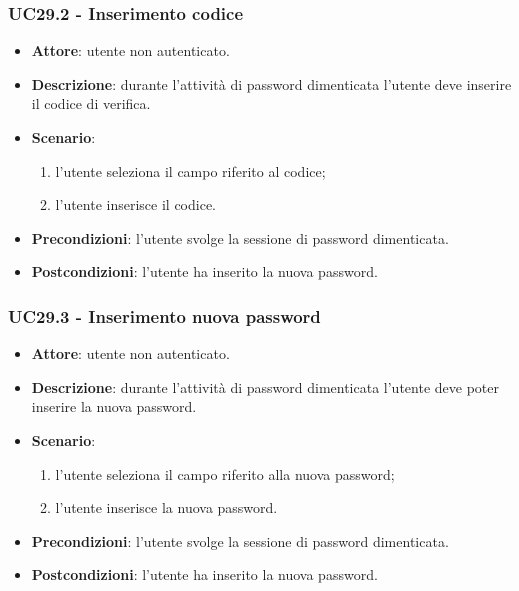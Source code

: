 \subsubsection{UC29.2 - Inserimento codice}
\begin{itemize}
    \item \textbf{Attore}: utente non autenticato.
    \item \textbf{Descrizione}: durante l'attività di password dimenticata l'utente deve inserire il codice di verifica.
    \item \textbf{Scenario}:
    \begin{enumerate}
        \item l'utente seleziona il campo riferito al codice;
        \item l'utente inserisce il codice.
    \end{enumerate}

    \item \textbf{Precondizioni}: l'utente svolge la sessione di password dimenticata.
    \item \textbf{Postcondizioni}: l'utente ha inserito la nuova password.
\end{itemize}

\subsubsection{UC29.3 - Inserimento nuova password}
\begin{itemize}
    \item \textbf{Attore}: utente non autenticato.
    \item \textbf{Descrizione}: durante l'attività di password dimenticata l'utente deve poter inserire la nuova password.
    \item \textbf{Scenario}:
    \begin{enumerate}
        \item l'utente seleziona il campo riferito alla nuova password;
        \item l'utente inserisce la nuova password.
    \end{enumerate}

    \item \textbf{Precondizioni}: l'utente svolge la sessione di password dimenticata.
    \item \textbf{Postcondizioni}: l'utente ha inserito la nuova password.
\end{itemize}

